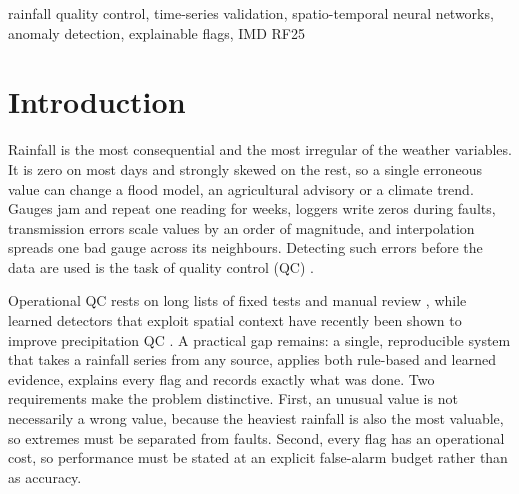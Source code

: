 \documentclass[conference,a4paper]{IEEEtran}
\begin{document}
\begin{IEEEkeywords}
rainfall quality control, time-series validation, spatio-temporal neural networks, anomaly detection, explainable flags, IMD RF25
\end{IEEEkeywords}

\section{Introduction}
Rainfall is the most consequential and the most irregular of the weather variables. It is zero on most days and strongly skewed on the rest, so a single erroneous value can change a flood model, an agricultural advisory or a climate trend. Gauges jam and repeat one reading for weeks, loggers write zeros during faults, transmission errors scale values by an order of magnitude, and interpolation spreads one bad gauge across its neighbours. Detecting such errors before the data are used is the task of quality control (QC) \cite{durre2010,chandola2009}.

Operational QC rests on long lists of fixed tests and manual review \cite{durre2010}, while learned detectors that exploit spatial context have recently been shown to improve precipitation QC \cite{sha2021}. A practical gap remains: a single, reproducible system that takes a rainfall series from any source, applies both rule-based and learned evidence, explains every flag and records exactly what was done. Two requirements make the problem distinctive. First, an unusual value is not necessarily a wrong value, because the heaviest rainfall is also the most valuable, so extremes must be separated from faults. Second, every flag has an operational cost, so performance must be stated at an explicit false-alarm budget rather than as accuracy.
\end{document}
